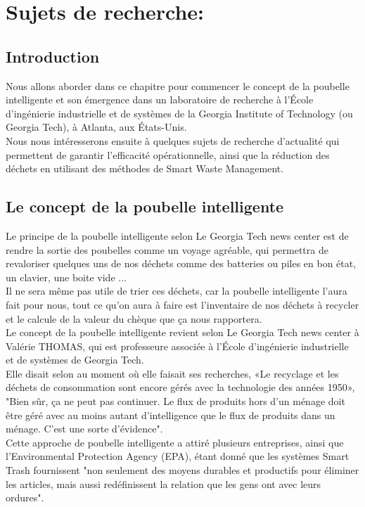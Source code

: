 \documentclass[a4paper,12pt]{report}
\begin{document}
\section{Sujets de recherche:}
\subsection{Introduction}
Nous allons aborder dans ce chapitre pour commencer le concept de la poubelle intelligente et son émergence dans un laboratoire de recherche à l'École d'ingénierie industrielle et de systèmes de la Georgia Institute of Technology (ou Georgia Tech), à Atlanta, aux États-Unis.\\ Nous nous intéresserons ensuite à quelques sujets de recherche d'actualité  qui permettent de garantir l'efficacité opérationnelle, ainsi que la réduction des déchets en utilisant des méthodes de Smart Waste Management. 
\subsection{Le concept de la poubelle intelligente}
Le principe de la poubelle intelligente selon Le Georgia Tech news center \cite{ref17} est de rendre la sortie des poubelles comme un voyage agréable, qui permettra de revaloriser quelques uns de nos déchets comme des batteries ou piles en bon état, un clavier, une boite vide ...\\
Il ne sera même pas utile de trier ces déchets, car la poubelle intelligente l'aura fait pour nous, tout ce qu'on aura à faire est l'inventaire de nos déchets à recycler et le calcule de la valeur du chèque que ça nous rapportera.\\
Le concept de la poubelle intelligente revient selon Le Georgia Tech news center à Valérie THOMAS, qui est professeure associée à l'École d'ingénierie industrielle et de systèmes de Georgia Tech.\\
Elle disait selon \cite{ref17} au moment où elle faisait ses recherches, «Le recyclage et les déchets de consommation sont encore gérés avec la technologie des années 1950», "Bien sûr, ça ne peut pas continuer. Le flux de produits hors d'un ménage doit être géré avec au moins autant d'intelligence que le flux de produits dans un ménage. C'est une sorte d'évidence".\\
Cette approche de poubelle intelligente a attiré plusieurs entreprises, ainsi que l'Environmental Protection Agency (EPA), étant donné que les systèmes Smart Trash fournissent "non seulement des moyens durables et productifs pour éliminer les articles, mais aussi redéfinissent la relation que les gens ont avec leurs ordures". \cite{ref17}\\
\end{document}
